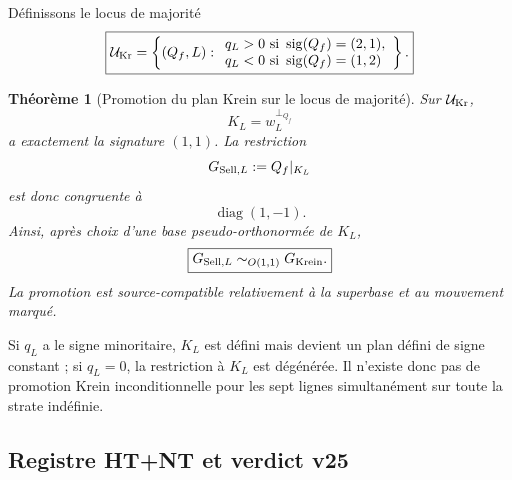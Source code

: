\documentclass[11pt,a4paper]{article}
\newtheorem{theorem}{Théorème}[section]
\begin{document}
Définissons le locus de majorité
\begin{equation}\label{eq:v25-Krein-locus}
 \boxed{
 \mathcal U_{\rm Kr}
 =
 \left\{
 (Q_f,L):
 \begin{array}{l}
 q_L>0\text{ si }\operatorname{sig}(Q_f)=(2,1),\\
 q_L<0\text{ si }\operatorname{sig}(Q_f)=(1,2)
 \end{array}
 \right\}.}
\end{equation}

\begin{theorem}[Promotion du plan Krein sur le locus de majorité]
Sur $\mathcal U_{\rm Kr}$,
\begin{equation}\label{eq:v25-Krein-plane-promoted}
 \boxed{
 K_L=w_L^{\perp_{Q_f}}}
\end{equation}
a exactement la signature $(1,1)$. La restriction
\[
 G_{{\rm Sell},L}:=Q_f|_{K_L}
\]
est donc congruente à
\[
 \operatorname{diag}(1,-1).
\]
Ainsi, après choix d'une base pseudo-orthonormée de $K_L$,
\begin{equation}\label{eq:v25-Krein-identification}
 \boxed{
 G_{{\rm Sell},L}
 \sim_{O(1,1)}
 G_{\rm Krein}.}
\end{equation}
La promotion est source-compatible relativement à la superbase et au mouvement marqué.
\end{theorem}

Si $q_L$ a le signe minoritaire, $K_L$ est défini mais devient un plan défini de signe constant ; si $q_L=0$, la restriction à $K_L$ est dégénérée. Il n'existe donc pas de promotion Krein inconditionnelle pour les sept lignes simultanément sur toute la strate indéfinie.

\subsection{Registre HT+NT et verdict v25}
\end{document}
